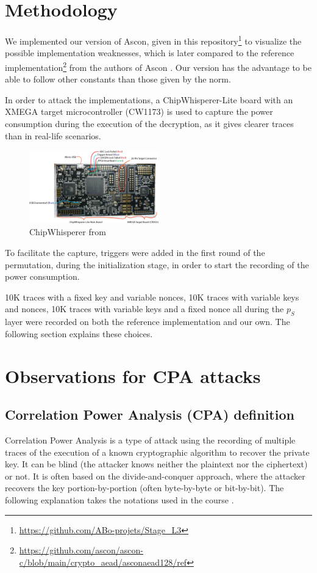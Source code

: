 \documentclass[11pt,technote]{IEEEtran}
\begin{document}
	\section{Methodology}
	We implemented our version of Ascon, given in this repository\footnote{\url{https://github.com/ABo-projets/Stage_L3}} to visualize the possible implementation weaknesses, which is later compared to the reference implementation\footnote{\url{https://github.com/ascon/ascon-c/blob/main/crypto\_aead/asconaead128/ref}} from the authors of Ascon \cite{ascon}. Our version has the advantage to be able to follow other constants than those given by the norm.
	
	In order to attack the implementations, a ChipWhisperer-Lite board with an XMEGA target microcontroller (CW1173) is used to capture the power consumption during the execution of the decryption, as it gives clearer traces than in real-life scenarios.
	
	\begin{figure}[h]
		\includegraphics[width=0.5\textwidth]{img_files/cwlite_basic1}
		\caption{ChipWhisperer from \cite{cwdoc}}
		\label{fig:cw}
	\end{figure}
	
	To facilitate the capture, triggers were added in the first round of the permutation, during the initialization stage, in order to start the recording of the power consumption.
	
	10K traces with a fixed key and variable nonces, 10K traces with variable keys and nonces, 10K traces with variable keys and a fixed nonce all during the $p_S$ layer were recorded on both the reference implementation and our own. The following section explains these choices.
	
	\section{Observations for CPA attacks}
	\subsection{Correlation Power Analysis (CPA) definition}
	Correlation Power Analysis\cite{cpa_aes} is a type of attack using the recording of multiple traces of the execution of a known cryptographic algorithm to recover the private key. It can be blind (the attacker knows neither the plaintext nor the ciphertext) or not. It is often based on the divide-and-conquer approach, where the attacker recovers the key portion-by-portion (often byte-by-byte or bit-by-bit). The following explanation takes the notations used in the course \cite{cours}.
	
\end{document}
